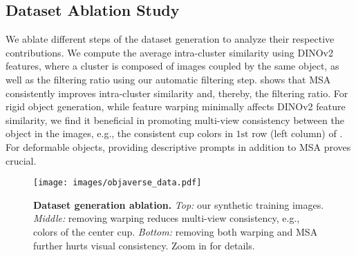 \subsection{Dataset Ablation Study}

 We ablate different steps of the dataset generation to analyze their respective contributions. We compute the average intra-cluster similarity using DINOv2 features, where a cluster is composed of images coupled by the same object, as well as the filtering ratio using our automatic filtering step.  shows that MSA consistently improves intra-cluster similarity and, thereby, the filtering ratio. For rigid object generation, while feature warping minimally affects DINOv2 feature similarity, we find it beneficial in promoting multi-view consistency between the object in the images, e.g., the consistent cup colors in $1{\text{st}}$ row (left column) of . For deformable objects, providing descriptive prompts in addition to MSA proves crucial.




\begin{figure}[t]
    \centering
    \texttt{[image: images/objaverse\_data.pdf]}
     \vspace{-15pt}
    \caption{{\textbf{Dataset generation ablation.} \textit{Top:} our synthetic training images. \textit{Middle:} removing warping reduces multi-view consistency, e.g., colors of the center cup. \textit{Bottom:} removing both warping and MSA
    further hurts visual consistency. Zoom in for details.
    }}
    \vspace{-8pt}
\end{figure}

